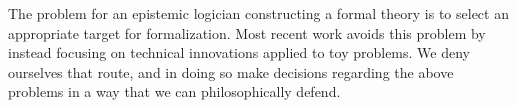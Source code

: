 The problem for an epistemic logician constructing a formal theory is to select an appropriate target for formalization. Most recent work avoids this problem by instead focusing on technical innovations applied to toy problems. We deny ourselves that route, and in doing so make decisions regarding the above problems in a way that we can philosophically defend.

%
%


